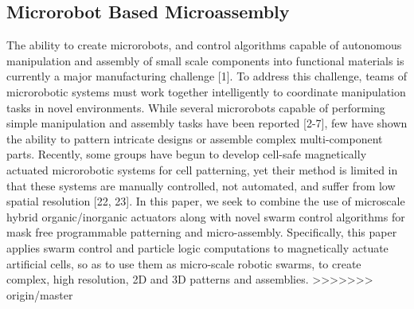 \subsection{Microrobot Based Microassembly}
The ability to create microrobots, and control algorithms capable of autonomous manipulation and assembly of small scale components into functional materials is currently a major manufacturing challenge [1]. 
To address this challenge, teams of microrobotic systems must work together intelligently to coordinate manipulation tasks in novel environments. 
While several microrobots capable of performing simple manipulation and assembly tasks have been reported [2-7], few have shown the ability to pattern intricate designs or assemble complex multi-component parts. 
Recently, some groups have begun to develop cell-safe magnetically actuated microrobotic systems for cell patterning, yet their method is limited in that these systems are manually controlled, not automated, and suffer from low spatial resolution [22, 23]. 
In this paper, we seek to combine the use of microscale hybrid organic/inorganic actuators along with novel swarm control algorithms for mask free programmable patterning and micro-assembly. 
Specifically, this paper applies swarm control and particle logic computations to magnetically actuate artificial cells, so as to use them as micro-scale robotic swarms, to create complex, high resolution, 2D and 3D patterns and assemblies.
>>>>>>> origin/master
